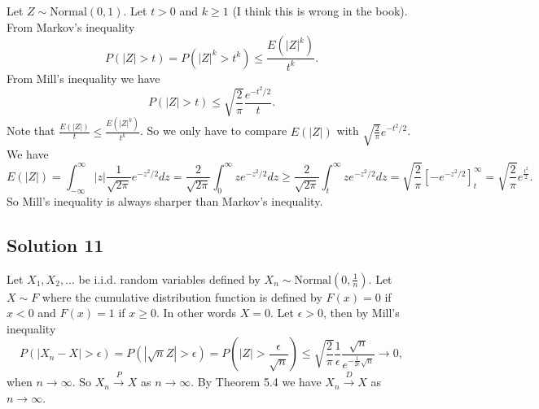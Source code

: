 Let $Z \sim \mathrm{Normal}(0, 1)$.
Let $t > 0$ and $k \geq 1$ (I think this is wrong in the book).
From Markov's inequality
\begin{equation*}
    P(|Z| > t) = P(|Z|^k > t^k)
        \leq \frac{E(|Z|^k)}{t^k}.
\end{equation*}
From Mill's inequality we have
\begin{equation*}
    P(|Z| > t) \leq \sqrt{\frac{2}{\pi}} \frac{e^{-t^2/2}}{t}.
\end{equation*}
Note that $\frac{E(|Z|)}{t} \leq \frac{E(|Z|^k)}{t^k}$.
So we only have to compare $E(|Z|)$ with $\sqrt{\frac{2}{\pi}} e^{-t^2/2}$.
We have
\begin{equation*}
    E(|Z|) = \int_{-\infty}^{\infty} |z| \frac{1}{\sqrt{2\pi}} e^{-z^2/2} dz
        = \frac{2}{\sqrt{2\pi}} \int_0^{\infty} z e^{-z^2/2} dz
        \geq \frac{2}{\sqrt{2\pi}} \int_t^{\infty} z e^{-z^2/2} dz
        = \sqrt{\frac{2}{\pi}} \left[ -e^{-z^2/2} \right]_{t}^{\infty}
        = \sqrt{\frac{2}{\pi}} e^{\frac{t^2}{2}}.
\end{equation*}
So Mill's inequality is always sharper than Markov's inequality.


\subsection*{Solution 11}

Let $X_1, X_2, ...$ be i.i.d. random variables defined by $X_n \sim \mathrm{Normal}(0, \frac{1}{n})$.
Let $X \sim F$ where the cumulative distribution function is defined by $F(x) = 0$ if $x < 0$ and $F(x) = 1$ if $x \geq 0$.
In other words $X = 0$.
Let $\epsilon > 0$, then by Mill's inequality
\begin{equation*}
    P(|X_n - X| > \epsilon) = P(|\sqrt{n} Z| > \epsilon)
        = P(|Z| > \frac{\epsilon}{\sqrt{n}})
        \leq \sqrt{\frac{2}{\pi}} \frac{1}{\epsilon} \frac{\sqrt{n}}{e^{-\frac{1}{2\epsilon} \sqrt{n}}}
        \to 0,
\end{equation*}
when $n \to \infty$.
So $X_n \xrightarrow{P} X$ as $n \to \infty$.
By Theorem 5.4 we have $X_n \xrightarrow{D} X$ as $n \to \infty$.
